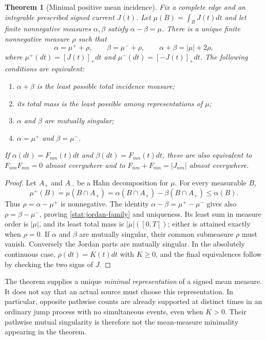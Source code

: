 \documentclass[11pt,oneside,openany]{book}
\newtheorem{theorem}{Theorem}[chapter]
\theoremstyle{definition}
\theoremstyle{remark}\newtheorem{remark}[theorem]{Remark}
\begin{document}
\begin{theorem}[Minimal positive mean incidence]\label{stat:jordan}
Fix a complete edge and an integrable prescribed signed current $J(t)$.
Let $\mu(B)=\int_B J(t)dt$ and let finite nonnegative measures $\alpha,\beta$
satisfy $\alpha-\beta=\mu$. There is a unique finite nonnegative measure
$\rho$ such that
\begin{equation}\label{stat:jordan-family}
 \alpha=\mu^++\rho,\qquad \beta=\mu^-+\rho,
 \qquad \alpha+\beta=|\mu|+2\rho,
\end{equation}
where $\mu^+(dt)=[J(t)]_+dt$ and $\mu^-(dt)=[-J(t)]_+dt$.
The following conditions are equivalent:
\begin{enumerate}
 \item $\alpha+\beta$ is the least possible total incidence measure;
 \item its total mass is the least possible among representations of $\mu$;
 \item $\alpha$ and $\beta$ are mutually singular;
 \item $\alpha=\mu^+$ and $\beta=\mu^-$.
\end{enumerate}
If $\alpha(dt)=F_{nm}(t)dt$ and $\beta(dt)=F_{mn}(t)dt$, these are also
equivalent to $F_{nm}F_{mn}=0$ almost everywhere and to
$F_{nm}+F_{mn}=|J_{nm}|$ almost everywhere.
\end{theorem}
\begin{proof}
Let $A_+$ and $A_-$ be a Hahn decomposition for $\mu$. For every measurable
$B$,
\[
 \mu^+(B)=\mu(B\cap A_+)
          =\alpha(B\cap A_+)-\beta(B\cap A_+)\leq\alpha(B).
\]
Thus $\rho=\alpha-\mu^+$ is nonnegative. The identity
$\alpha-\beta=\mu^+-\mu^-$ gives also $\rho=\beta-\mu^-$, proving
\eqref{stat:jordan-family} and uniqueness. Its least sum in measure order
is $|\mu|$, and its least total mass is $|\mu|([0,T])$; either is attained
exactly when $\rho=0$. If $\alpha$ and $\beta$ are mutually singular, their
common submeasure $\rho$ must vanish. Conversely the Jordan parts are
mutually singular. In the absolutely continuous case,
$\rho(dt)=K(t)dt$ with $K\geq0$, and the final equivalences follow by
checking the two signs of $J$.
\end{proof}

The theorem supplies a unique \emph{minimal representation} of a signed
mean measure. It does not say that an actual source must choose this
representation. In particular, opposite pathwise counts are already
supported at distinct times in an ordinary jump process with no simultaneous
events, even when $K>0$. Their pathwise mutual singularity is therefore not
the mean-measure minimality appearing in the theorem.
\end{document}
